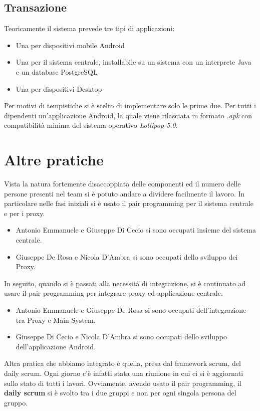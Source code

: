 \subsection{Transazione}
Teoricamente il sistema prevede tre tipi di applicazioni:
\begin{itemize}
	\item Una per dispositivi mobile Android
	\item Una per il sistema centrale, installabile su un sistema con un interprete Java e un database PostgreSQL
	\item Una per dispositivi Desktop 
\end{itemize}
Per motivi di tempistiche si è scelto di implementare solo le prime due. Per tutti i dipendenti un'applicazione Android, la quale viene rilasciata in formato \textit{.apk} con compatibilità minima del sistema operativo \textit{Lollipop 5.0}.

\section{Altre pratiche}
Vista la natura fortemente disaccoppiata delle componenti ed il numero delle persone presenti nel team si è potuto andare a dividere facilmente il lavoro.
In particolare nelle fasi iniziali si è usato il pair programming per il sistema centrale e per i proxy.
\begin{itemize}
	\item Antonio Emmanuele e Giuseppe Di Cecio si sono occupati insieme del sistema centrale.
	\item Giuseppe De Rosa e Nicola D’Ambra si sono occupati dello sviluppo dei Proxy.
\end{itemize}
In seguito, quando si è passati alla necessità di integrazione, si è continuato ad usare il pair programming per integrare proxy ed applicazione centrale. 
\begin{itemize}
	\item Antonio Emmanuele e Giuseppe De Rosa si sono occupati dell'integrazione tra Proxy e Main System.
	\item Giuseppe Di Cecio e Nicola D’Ambra si sono occupati dello sviluppo dell'applicazione Android.
\end{itemize}
Altra pratica che abbiamo integrato è quella, presa dal framework scrum, del daily scrum.
Ogni giorno c’è infatti stata una riunione in cui ci si è aggiornati sullo stato di tutti i lavori.
Ovviamente, avendo usato il pair programming, il \textbf{daily scrum} si è svolto tra i due gruppi e non per ogni singola persona del gruppo.